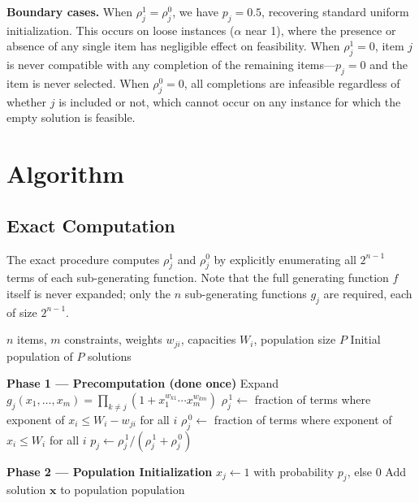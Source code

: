 \documentclass[twocolumn]{article}
\begin{document}
\noindent \textbf{Boundary cases.}
When $\rho_j^1 = \rho_j^0$, we have $p_j = 0.5$, recovering standard 
uniform initialization. This occurs on loose instances ($\alpha$ near 1), 
where the presence or absence of any single item has negligible effect 
on feasibility. When $\rho_j^1 = 0$, item $j$ is never compatible with 
any completion of the remaining items---$p_j = 0$ and the item is never 
selected. When $\rho_j^0 = 0$, all completions are infeasible regardless 
of whether $j$ is included or not, which cannot occur on any instance 
for which the empty solution is feasible.

\section{Algorithm}
\label{sec:algorithm}

\subsection{Exact Computation}
\label{sec:exact}

The exact procedure computes $\rho_j^1$ and $\rho_j^0$ by explicitly 
enumerating all $2^{n-1}$ terms of each sub-generating function. Note 
that the full generating function $f$ itself is never expanded; only the 
$n$ sub-generating functions $g_j$ are required, each of size $2^{n-1}$.

\begin{algorithm}[H]
\caption{GF-Informed Initialization (Exact)}
\label{alg:exact}
\begin{algorithmic}[1]
\Require $n$ items, $m$ constraints, weights $w_{ji}$, 
         capacities $W_i$, population size $P$
\Ensure Initial population of $P$ solutions

\Statex \textbf{Phase 1 --- Precomputation (done once)}
    \State Expand $g_j(x_1, \ldots, x_m) = 
           \displaystyle\prod_{k \neq j} 
           \left(1 + x_1^{w_{k1}} \cdots x_m^{w_{km}}\right)$
    \State $\rho_{j}^{\,1} \gets$ fraction of terms where 
           exponent of $x_i \leq W_i - w_{ji}$ for all $i$
    \State $\rho_{j}^{\,0} \gets$ fraction of terms where 
           exponent of $x_i \leq W_i$ for all $i$
    \State $p_j \gets \rho_{j}^{\,1} / 
           (\rho_{j}^{\,1} + \rho_{j}^{\,0})$
\EndFor

\Statex \textbf{Phase 2 --- Population Initialization}
        \State $x_j \gets 1$ with probability $p_j$, else $0$
    \EndFor
    \State Add solution $\mathbf{x}$ to population
\EndFor
\State \Return population
\end{algorithmic}
\end{algorithm}
\end{document}
